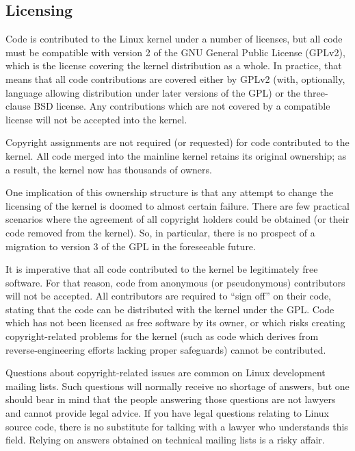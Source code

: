 \documentclass[a4paper,8pt,english]{sphinxmanual}
\begin{document}
\subsection{Licensing}
\label{process/1.Intro:licensing}
Code is contributed to the Linux kernel under a number of licenses, but all
code must be compatible with version 2 of the GNU General Public License
(GPLv2), which is the license covering the kernel distribution as a whole.
In practice, that means that all code contributions are covered either by
GPLv2 (with, optionally, language allowing distribution under later
versions of the GPL) or the three-clause BSD license.  Any contributions
which are not covered by a compatible license will not be accepted into the
kernel.

Copyright assignments are not required (or requested) for code contributed
to the kernel.  All code merged into the mainline kernel retains its
original ownership; as a result, the kernel now has thousands of owners.

One implication of this ownership structure is that any attempt to change
the licensing of the kernel is doomed to almost certain failure.  There are
few practical scenarios where the agreement of all copyright holders could
be obtained (or their code removed from the kernel).  So, in particular,
there is no prospect of a migration to version 3 of the GPL in the
foreseeable future.

It is imperative that all code contributed to the kernel be legitimately
free software.  For that reason, code from anonymous (or pseudonymous)
contributors will not be accepted.  All contributors are required to ``sign
off'' on their code, stating that the code can be distributed with the
kernel under the GPL.  Code which has not been licensed as free software by
its owner, or which risks creating copyright-related problems for the
kernel (such as code which derives from reverse-engineering efforts lacking
proper safeguards) cannot be contributed.

Questions about copyright-related issues are common on Linux development
mailing lists.  Such questions will normally receive no shortage of
answers, but one should bear in mind that the people answering those
questions are not lawyers and cannot provide legal advice.  If you have
legal questions relating to Linux source code, there is no substitute for
talking with a lawyer who understands this field.  Relying on answers
obtained on technical mailing lists is a risky affair.
\end{document}
